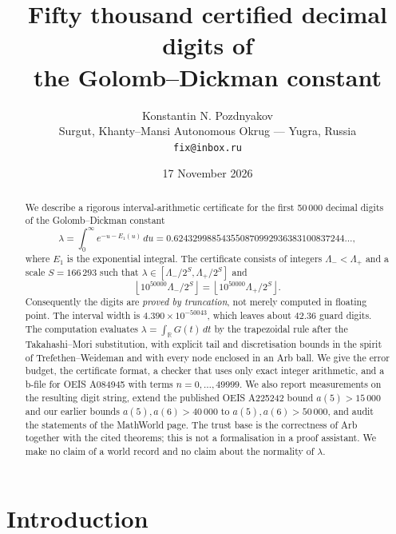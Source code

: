 \documentclass[11pt,a4paper]{article}
\title{Fifty thousand certified decimal digits of\\ the Golomb--Dickman constant}
\author{Konstantin N. Pozdnyakov\\
\small Surgut, Khanty--Mansi Autonomous Okrug --- Yugra, Russia\\
\small \texttt{fix@inbox.ru}}
\date{17 November 2026}
\theoremstyle{remark}
\newcommand{\Eone}{E_1}
\newcommand{\lam}{\lambda}
\newcommand{\R}{\mathbb{R}}
\newcommand{\floor}[1]{\left\lfloor #1 \right\rfloor}
\begin{document}
\maketitle

\begin{center}
\end{center}

\begin{abstract}
We describe a rigorous interval-arithmetic certificate for the first
50\,000 decimal digits of the Golomb--Dickman constant
\[
  \lam=\int_0^\infty e^{-u-\Eone(u)}\,du
      =0.624329988543550870992936383100837244\ldots,
\]
where $\Eone$ is the exponential integral. The certificate consists of
integers $\Lambda_-<\Lambda_+$ and a scale $S=166\,293$ such that
$\lam\in[\Lambda_-/2^S,\Lambda_+/2^S]$ and
\[
  \floor{10^{50000}\Lambda_-/2^S}
  =\floor{10^{50000}\Lambda_+/2^S}.
\]
Consequently the digits are \emph{proved by truncation}, not merely
computed in floating point. The interval width is
$4.390\times10^{-50043}$, which leaves about $42.36$ guard digits. The
computation evaluates
$\lam=\int_{\R}G(t)\,dt$ by the trapezoidal rule after the
Takahashi--Mori substitution, with explicit tail and discretisation
bounds in the spirit of Trefethen--Weideman and with every node enclosed
in an Arb ball. We give the error budget, the certificate format, a
checker that uses only exact integer arithmetic, and a b-file for OEIS
A084945 with terms $n=0,\ldots,49999$. We also report measurements on the
resulting digit string, extend the published OEIS A225242 bound
$a(5)>15\,000$ and our earlier bounds $a(5),a(6)>40\,000$ to
$a(5),a(6)>50\,000$, and audit the statements of the MathWorld page.
The trust base is the correctness of Arb together with the cited
theorems; this is not a formalisation in a proof assistant. We make no
claim of a world record and no claim about the normality of $\lam$.
\end{abstract}

\tableofcontents

\section{Introduction}
\end{document}
